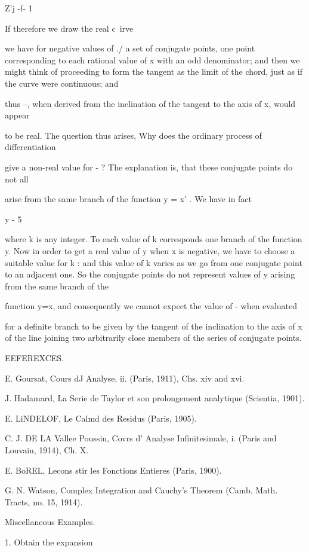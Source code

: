 {{{{Z'j -f- 1

If therefore we draw the real c\ irve

we have for negative values of ./ a set of conjugate points, one point
corresponding to each rational value of x with an odd denominator;
and then we might think of proceeding to form the tangent as the limit
of the chord, just as if the curve were continuous; and

thus --, when derived from the inclination of the tangent to the axis
of x, would appear

to be real. The question thus arises, Why does the ordinary process of
differentiation

give a non-real value for - ? The explanation is, that these conjugate
points do not all

arise from the same branch of the function y = x' . We have in fact 

y - 5

where k is any integer. To each value of k corresponds one branch of
the function y. Now in order to get a real value of y when x is
negative, we have to choose a suitable value for k : and this value of
k varies as we go from one conjugate point to an adjacent one. So the
conjugate points do not represent values of y arising from the same
branch of the

function y=x, and consequently we cannot expect the value of - when
evaluated

for a definite branch to be given by the tangent of the inclination to
the axis of x of the line joining two arbitrarily close members of the
series of conjugate points.

%
%

EEFEREXCES.

E. Goursat, Cours dJ Analyse, ii. (Paris, 1911), Chs. xiv and xvi.

J. Hadamard, La Serie de Taylor et son prolongement analytique
(Scientia, 1901).

E. LiNDELOF, Le Calmd des Residus (Paris, 1905).

C. J. DE LA Vallee Poussin, Covrs d' Analyse Infinitesimale, i. (Paris
and Louvain, 1914), Ch. X.

E. BoREL, Lecons stir les Fonctions Entieres (Paris, 1900).

G. N. Watson, Complex Integration and Cauchy's Theorem (Camb. Math.
Tracts, no. 15, 1914).

Miscellaneous Examples.

1. Obtain the expansion

}}}}
